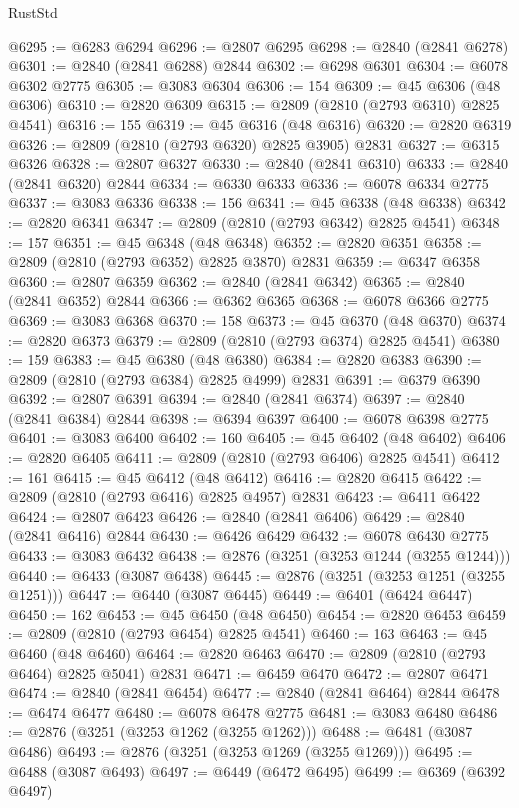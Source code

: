 \begin{lexlean}{RustStd}
\begin{coremodule}
@6295 := @6283 @6294
@6296 := @2807 @6295
@6298 := @2840 (@2841 @6278)
@6301 := @2840 (@2841 @6288) @2844
@6302 := @6298 @6301
@6304 := @6078 @6302 @2775
@6305 := @3083 @6304
@6306 := 154
@6309 := @45 @6306 (@48 @6306)
@6310 := @2820 @6309
@6315 := @2809 (@2810 (@2793 @6310) @2825 @4541)
@6316 := 155
@6319 := @45 @6316 (@48 @6316)
@6320 := @2820 @6319
@6326 := @2809 (@2810 (@2793 @6320) @2825 @3905) @2831
@6327 := @6315 @6326
@6328 := @2807 @6327
@6330 := @2840 (@2841 @6310)
@6333 := @2840 (@2841 @6320) @2844
@6334 := @6330 @6333
@6336 := @6078 @6334 @2775
@6337 := @3083 @6336
@6338 := 156
@6341 := @45 @6338 (@48 @6338)
@6342 := @2820 @6341
@6347 := @2809 (@2810 (@2793 @6342) @2825 @4541)
@6348 := 157
@6351 := @45 @6348 (@48 @6348)
@6352 := @2820 @6351
@6358 := @2809 (@2810 (@2793 @6352) @2825 @3870) @2831
@6359 := @6347 @6358
@6360 := @2807 @6359
@6362 := @2840 (@2841 @6342)
@6365 := @2840 (@2841 @6352) @2844
@6366 := @6362 @6365
@6368 := @6078 @6366 @2775
@6369 := @3083 @6368
@6370 := 158
@6373 := @45 @6370 (@48 @6370)
@6374 := @2820 @6373
@6379 := @2809 (@2810 (@2793 @6374) @2825 @4541)
@6380 := 159
@6383 := @45 @6380 (@48 @6380)
@6384 := @2820 @6383
@6390 := @2809 (@2810 (@2793 @6384) @2825 @4999) @2831
@6391 := @6379 @6390
@6392 := @2807 @6391
@6394 := @2840 (@2841 @6374)
@6397 := @2840 (@2841 @6384) @2844
@6398 := @6394 @6397
@6400 := @6078 @6398 @2775
@6401 := @3083 @6400
@6402 := 160
@6405 := @45 @6402 (@48 @6402)
@6406 := @2820 @6405
@6411 := @2809 (@2810 (@2793 @6406) @2825 @4541)
@6412 := 161
@6415 := @45 @6412 (@48 @6412)
@6416 := @2820 @6415
@6422 := @2809 (@2810 (@2793 @6416) @2825 @4957) @2831
@6423 := @6411 @6422
@6424 := @2807 @6423
@6426 := @2840 (@2841 @6406)
@6429 := @2840 (@2841 @6416) @2844
@6430 := @6426 @6429
@6432 := @6078 @6430 @2775
@6433 := @3083 @6432
@6438 := @2876 (@3251 (@3253 @1244 (@3255 @1244)))
@6440 := @6433 (@3087 @6438)
@6445 := @2876 (@3251 (@3253 @1251 (@3255 @1251)))
@6447 := @6440 (@3087 @6445)
@6449 := @6401 (@6424 @6447)
@6450 := 162
@6453 := @45 @6450 (@48 @6450)
@6454 := @2820 @6453
@6459 := @2809 (@2810 (@2793 @6454) @2825 @4541)
@6460 := 163
@6463 := @45 @6460 (@48 @6460)
@6464 := @2820 @6463
@6470 := @2809 (@2810 (@2793 @6464) @2825 @5041) @2831
@6471 := @6459 @6470
@6472 := @2807 @6471
@6474 := @2840 (@2841 @6454)
@6477 := @2840 (@2841 @6464) @2844
@6478 := @6474 @6477
@6480 := @6078 @6478 @2775
@6481 := @3083 @6480
@6486 := @2876 (@3251 (@3253 @1262 (@3255 @1262)))
@6488 := @6481 (@3087 @6486)
@6493 := @2876 (@3251 (@3253 @1269 (@3255 @1269)))
@6495 := @6488 (@3087 @6493)
@6497 := @6449 (@6472 @6495)
@6499 := @6369 (@6392 @6497)

\end{coremodule}
\end{lexlean}
